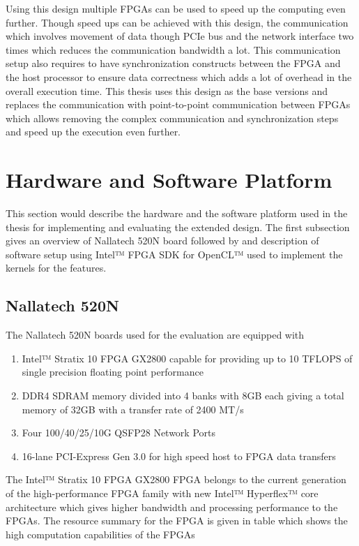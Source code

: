 Using this design multiple FPGAs can be used to speed up the computing even further.
Though speed ups can be achieved with this design, the communication which involves
movement of data though \ac{PCIe} bus and the network interface two times which
reduces the communication bandwidth a lot. This communication setup also
requires to have synchronization constructs between the FPGA and the host
processor to ensure data correctness which adds a lot of overhead in the overall
execution time. This thesis uses this design as the base versions and replaces
the communication with point-to-point communication between FPGAs which allows
removing the complex communication and synchronization steps and speed up the
execution even further.

\section{Hardware and Software Platform}

This section would describe the hardware and the software platform used in the
thesis for implementing and evaluating the extended design. The first subsection
gives an overview of Nallatech 520N board followed by and description of software
setup using Intel™ FPGA SDK for OpenCL™ used to implement the kernels for the 
features.

\subsection{Nallatech 520N}

The Nallatech 520N boards used for the evaluation are equipped with 

\begin{enumerate}
    \item Intel™ Stratix 10 FPGA GX2800 capable for providing up to 10 TFLOPS of single
    precision floating point performance
    \item DDR4 SDRAM memory divided into 4 banks with 8GB each giving a total memory of 32GB with
    a transfer rate of 2400 MT/s
    \item Four 100/40/25/10G QSFP28 Network Ports
    \item 16-lane PCI-Express Gen 3.0 for high speed host to FPGA data transfers
\end{enumerate}

The Intel™ Stratix 10 FPGA GX2800 FPGA belongs to the current generation of the high-performance FPGA
family with new Intel™ Hyperflex™ core architecture which gives higher bandwidth and processing
performance to the FPGAs. The resource summary for the FPGA is given in table 
which shows the high computation capabilities of the FPGAs

